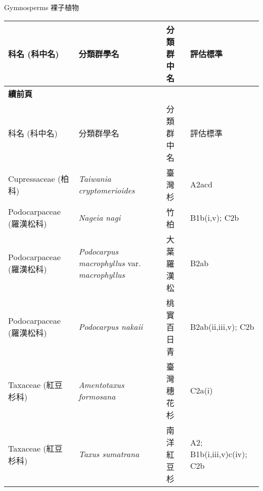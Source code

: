 \noindent\normalfont\selectfont Gymnosperms 裸子植物
\footnotesize\selectfont
        \begin{longtable}{p{3cm}p{5cm}p{3cm}p{4cm}}
        \toprule
          科名 (科中名) & 分類群學名 & 分類群中名 & 評估標準 \\
        \midrule 
        \endfirsthead

        {{\bfseries 續前頁 }} \\
        科名 (科中名) & 分類群學名 & 分類群中名 & 評估標準 \\
        \midrule
        \endhead
                Cupressaceae (柏科) & \textit{Taiwania cryptomerioides}  & 臺灣杉 & A2acd \index{Taiwania@\textit{Taiwania}!cryptomerioides@\textit{cryptomerioides}}  \index{臺灣杉} \\
    Podocarpaceae (羅漢松科) & \textit{Nageia nagi}  & 竹柏 & B1b(i,v); C2b \index{Nageia@\textit{Nageia}!nagi@\textit{nagi}}  \index{竹柏} \\
    Podocarpaceae (羅漢松科) & \textit{Podocarpus macrophyllus} var. \textit{macrophyllus}  & 大葉羅漢松 & B2ab \index{Podocarpus@\textit{Podocarpus}!macrophyllus@\textit{macrophyllus}!var. macrophyllus@var. \textit{macrophyllus}}  \index{大葉羅漢松} \\
    Podocarpaceae (羅漢松科) & \textit{Podocarpus nakaii}  & 桃實百日青 & B2ab(ii,iii,v); C2b \index{Podocarpus@\textit{Podocarpus}!nakaii@\textit{nakaii}}  \index{桃實百日青} \\
    Taxaceae (紅豆杉科) & \textit{Amentotaxus formosana}  & 臺灣穗花杉 & C2a(i) \index{Amentotaxus@\textit{Amentotaxus}!formosana@\textit{formosana}}  \index{臺灣穗花杉} \\
    Taxaceae (紅豆杉科) & \textit{Taxus sumatrana}  & 南洋紅豆杉 & A2; B1b(i,iii,v)c(iv); C2b \index{Taxus@\textit{Taxus}!sumatrana@\textit{sumatrana}}  \index{南洋紅豆杉} \\
    \bottomrule
        \end{longtable}
